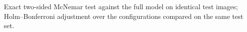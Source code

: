 Exact two-sided McNemar test against the full model on identical test images; Holm--Bonferroni adjustment over the configurations compared on the same test set.
